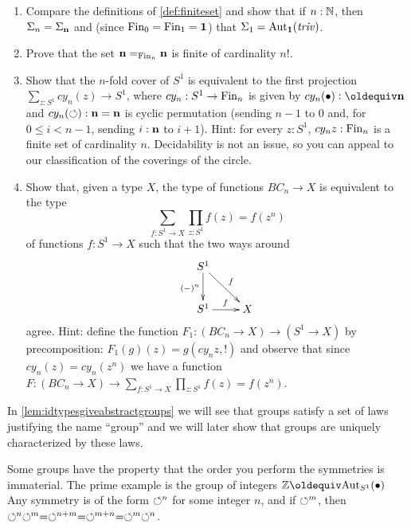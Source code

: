 \begin{xca}
  \begin{enumerate}
  \item Compare the definitions of \cref{def:finiteset} and show that if $n:\mathbb{N}$, then $\Sigma_n=\Sigma_{\mathbf{n} }$ %
and (since $\operatorname{Fin}_0=\operatorname{Fin}_1=\mathbf{1}$) that $\Sigma_{1}=\mathrm{Aut}_{\mathbf{1} }(\mathop{\mathit{triv}})$.
\item Prove that the set $\mathbf{n} =_{\operatorname{Fin}_n}\mathbf{n} $ is finite of cardinality $n!$.
\item Show that the $n$-fold cover of $S^1$ is equivalent to the first projection $\sum_{z:S^1}cy_n(z)\to S^1$, where $cy_n:S^1\to\operatorname{Fin}_n$ is given by $cy_n(\base)\defequi\bn n$ and $cy_n(\circlearrowleft):\mathbf{n}=\mathbf{n}$ is cyclic permutation (sending $n-1$ to $0$ and, for $0\leq i<n-1$, sending $i:\mathbf{n}$ to $i+1$).  Hint: for every $z:S^1$, $cy_nz:\operatorname{Fin}_n$ is a finite set of cardinality $n$.  Decidability is not an issue, so you can appeal to our classification of the coverings of the circle.
\item Show that, given a type $X$, the type of functions $BC_n\to X$ is equivalent to the type 
$$\sum_{f:S^1\to X}\prod_{z:S^1}f(z)=f(z^n)$$ of functions $f:S^1\to X$ such that the two ways around
$$\xymatrix{S^1\ar[d]_{(-)^n}\ar[dr]^f&\\S^1\ar[r]^f&X}$$
agree.  Hint: define the function $F_1:(BC_n\to X)\to (S^1\to X)$ by precomposition: $F_1(g)(z)=g(cy_nz,!)$ and observe that since $cy_n(z)=cy_n(z^n)$ we have a function $F:(BC_n\to X)\to \sum_{f:S^1\to X}\prod_{z:S^1}f(z)=f(z^n)$.
  \end{enumerate} 
\end{xca}

\begin{remark}
In \cref{lem:idtypesgiveabstractgroups} we will see that groups satisfy a set of laws justifying the name ``group''
and we will later show that groups are uniquely characterized by these laws.
\end{remark}
Some groups have the property that the order you perform the symmetries is immaterial.  The prime example is the group of integers $\ZZ\oldequiv \aut_{S^1}(\base)$  Any symmetry is of the form $\circlearrowleft^n$ for some integer $n$, and if $\circlearrowleft^m$, then $\circlearrowleft^n\circlearrowleft^m=\circlearrowleft^{n+m}=\circlearrowleft^{m+n}=\circlearrowleft^m\circlearrowleft^n$.

